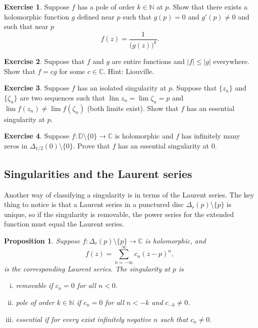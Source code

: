 \documentclass[12pt,openany]{book}
\newcommand{\sabs}[1]{\lvert {#1} \rvert}
\newcommand{\C}{{\mathbb{C}}}
\newcommand{\N}{{\mathbb{N}}}
\newcommand{\D}{{\mathbb{D}}}
\theoremstyle{plain}
\newtheorem{prop}[thm]{Proposition}
\theoremstyle{remark}
\theoremstyle{definition}
\newenvironment{exbox}{%
    \def\FrameCommand{\vrule width 1pt \relax\hspace{10pt}}%
    \MakeFramed{\advance\hsize-\width\FrameRestore}%
}{%
    \endMakeFramed
}
\theoremstyle{exercise}
\newtheorem{exercise}{Exercise}[section]
\theoremstyle{example}
\begin{document}
\begin{exbox}
\begin{exercise}
Suppose $f$ has a pole of order $k \in \N$ at $p$.
Show that there exists a holomorphic function $g$ defined near $p$
such that $g(p) = 0$ and $g'(p) \not= 0$ and such that near $p$
\begin{equation*}
f(z) = \frac{1}{{\bigl(g(z)\bigr)}^k} .
\end{equation*}
\end{exercise}

\begin{exercise}
Suppose that $f$ and $g$ are entire functions and $\sabs{f} \leq \sabs{g}$
everywhere.  Show that $f = c g$ for some $c \in \C$.  Hint: Liouville.
\end{exercise}

\begin{exercise}
Suppose $f$ has an isolated singularity at $p$.  Suppose that
$\{ z_n \}$ and $\{ \zeta_n \}$ are two sequences such that
$\lim z_n = \lim \zeta_n = p$ and $\lim f(z_n) \not= \lim f(\zeta_n)$
(both limits exist).
Show that $f$ has an essential singularity at $p$.
\end{exercise}

\begin{exercise}
Suppose $f \colon \D \setminus \{0\} \to \C$ is holomorphic and
$f$ has infinitely many zeros in $\Delta_{1/2}(0) \setminus \{ 0 \}$.
Prove that $f$ has an essential singularity at $0$.
\end{exercise}
\end{exbox}

\subsection{Singularities and the Laurent series}

Another way of classifying a singularity is in terms of the Laurent series.
The key thing to notice is that a Laurent series in a punctured
disc $\Delta_r(p) \setminus \{p\}$ is unique, so if the singularity is
removable, the power
series for the extended function must equal the Laurent series.

\begin{prop}
Suppose $f \colon \Delta_r(p) \setminus \{p\} \to \C$ is holomorphic,
and
\begin{equation*}
f(z) = \sum_{n=-\infty}^\infty c_n {(z-p)}^n ,
\end{equation*}
is the corresponding Laurent series.
The singularity at $p$ is
\begin{enumerate}[(i)]
\item \emph{removable} if $c_n = 0$ for all $n < 0$.
\item \emph{pole} of order $k \in \N$ if $c_n = 0$ for all $n < -k$ and
$c_{-k}
\not= 0$.
\item \emph{essential} if for every exist infinitely negative $n$
such that $c_n \not= 0$.
\end{enumerate}
\end{prop}
\end{document}
